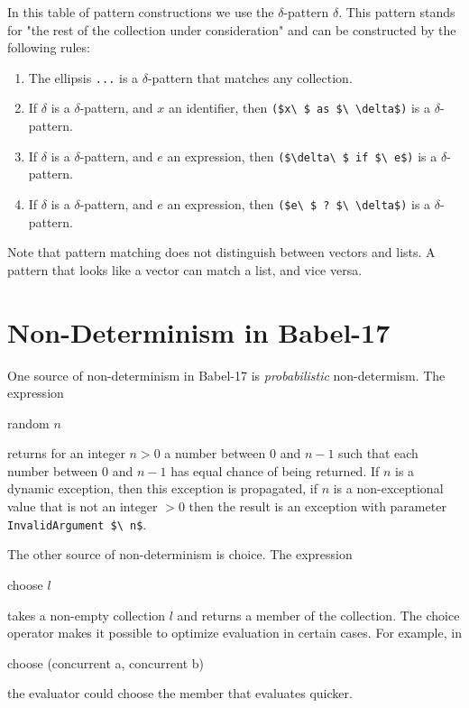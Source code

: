 \documentclass[11pt]{amsart}
\newcommand{\babelsrc}[1] {\lstinline!#1!}
\begin{document}
In this table of pattern constructions we use the $\delta$-pattern $\delta$. This pattern stands for "the rest of the collection under consideration" and can be constructed by the following rules:
\begin{enumerate}
\item The ellipsis \babelsrc{...} is a $\delta$-pattern that matches any collection.
\item If $\delta$ is a $\delta$-pattern, and $x$ an identifier, then \babelsrc{($x\ $ as $\ \delta$)} is a $\delta$-pattern.
\item If $\delta$ is a $\delta$-pattern, and $e$ an expression, then \babelsrc{($\delta\ $ if $\ e$)} is a $\delta$-pattern.
\item If $\delta$ is a $\delta$-pattern, and $e$ an expression, then \babelsrc{($e\ $ ? $\ \delta$)} is a $\delta$-pattern.\end{enumerate}

Note that pattern matching does not distinguish between vectors and lists. A pattern that looks like a vector can match a list, and vice versa.

\section{Non-Determinism in Babel-17}

One source of non-determinism in Babel-17 is \emph{probabilistic} non-determism. The expression
\begin{babellisting}
random $n$
\end{babellisting}
returns for an integer $n > 0$ a number between $0$ and $n-1$ such that each number between $0$ and $n-1$ has equal chance of being returned. If $n$ is a dynamic exception, then this exception is propagated, if $n$ is a non-exceptional value that is not an integer $> 0$ then the result is an exception with parameter \babelsrc{InvalidArgument $\ n$}.

The other source of non-determinism is choice. The expression
\begin{babellisting}
choose $l$
\end{babellisting}
takes a non-empty collection $l$ and returns a member of the collection. The choice operator makes it possible to optimize evaluation in certain cases. For example, in 
\begin{babellisting}
choose (concurrent a, concurrent b)
\end{babellisting}
the evaluator could choose the member that evaluates quicker.
\end{document}
